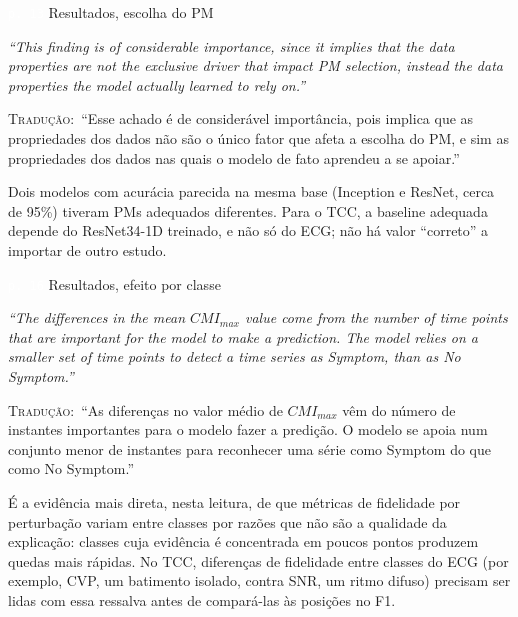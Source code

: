 \documentclass[11pt,a4paper]{article}
\newcommand{\pagechip}[1]{{\setlength{\fboxsep}{1.5pt}\colorbox{cAcc}{\textcolor{white}{\scriptsize\texttt{#1}}}}}
\newenvironment{origquote}{\par\itshape\small}{\par}
\newenvironment{tradquote}{\par\small\textsc{Tradução:}\ }{\par}
\newcommand{\explab}[1]{\par\smallskip{\small\color{cAcc}\textbf{\MakeUppercase{#1}}}\par}
\begin{document}
\begin{citacard}{\pagechip{p. 13} Resultados, escolha do PM}
\begin{origquote}“This finding is of considerable importance, since it implies that the data properties are not the exclusive driver that impact PM selection, instead the data properties the model actually learned to rely on.”\end{origquote}
\begin{tradquote}“Esse achado é de considerável importância, pois implica que as propriedades dos dados não são o único fator que afeta a escolha do PM, e sim as propriedades dos dados nas quais o modelo de fato aprendeu a se apoiar.”\end{tradquote}
\explab{Explicação}
Dois modelos com acurácia parecida na mesma base (Inception e ResNet, cerca de 95\%) tiveram PMs adequados diferentes. Para o TCC, a baseline adequada depende do ResNet34-1D treinado, e não só do ECG; não há valor ``correto'' a importar de outro estudo.
\end{citacard}

\begin{citacard}{\pagechip{p. 16} Resultados, efeito por classe}
\begin{origquote}“The differences in the mean $CMI_{max}$ value come from the number of time points that are important for the model to make a prediction. The model relies on a smaller set of time points to detect a time series as Symptom, than as No Symptom.”\end{origquote}
\begin{tradquote}“As diferenças no valor médio de $CMI_{max}$ vêm do número de instantes importantes para o modelo fazer a predição. O modelo se apoia num conjunto menor de instantes para reconhecer uma série como Symptom do que como No Symptom.”\end{tradquote}
\explab{Explicação}
É a evidência mais direta, nesta leitura, de que métricas de fidelidade por perturbação variam entre classes por razões que não são a qualidade da explicação: classes cuja evidência é concentrada em poucos pontos produzem quedas mais rápidas. No TCC, diferenças de fidelidade entre classes do ECG (por exemplo, CVP, um batimento isolado, contra SNR, um ritmo difuso) precisam ser lidas com essa ressalva antes de compará-las às posições no F1.
\end{citacard}
\end{document}
